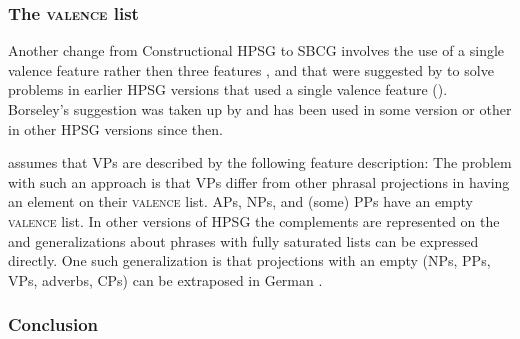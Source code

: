 \subsubsection{The \textsc{valence} list}
\label{sec-valence-feature-sbcg}

Another change from Constructional HPSG to SBCG involves the use of a single valence feature rather
then three features \spr, \subj and \comps that were suggested by \citet{Borsley87} to solve problems in
earlier HPSG versions that used a single valence feature (\subcat). Borseley's suggestion was taken up by
\citet[Chapter~9]{ps2} and has been used in some version or other in other HPSG versions since then. 

\citet[]{Sag2012a} assumes that VPs are described by the following
feature description:
\ea
{}
\z
The problem with such an approach is that VPs differ from other phrasal projections in having an
element on their \textsc{valence} list. APs, NPs, and (some) PPs have an empty \textsc{valence} list. In
other versions of HPSG the complements are represented on the \compsl and generalizations about
phrases with fully saturated \comps lists can be expressed directly. One such generalization is that
projections with an empty \compsl (NPs, PPs, VPs, adverbs, CPs) can be extraposed in German \citep[Section~13.1.2]{Mueller99a}.



\subsubsection{Conclusion}

